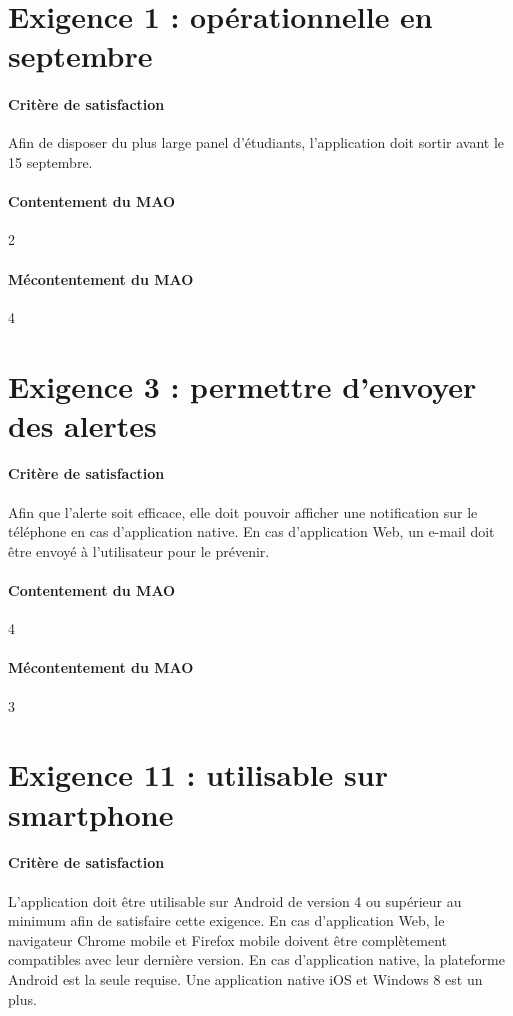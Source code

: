 \documentclass[a4paper, 12pt, french]{article}
\begin{document}
	\section{Exigence 1 : opérationnelle en septembre}

	\paragraph{Critère de satisfaction}
	Afin de disposer du plus large panel d'étudiants, l'application doit sortir avant le 15 septembre.

	\paragraph{Contentement du MAO}
	2

	\paragraph{Mécontentement du MAO}
	4

	\section{Exigence 3 : permettre d'envoyer des alertes}

	\paragraph{Critère de satisfaction}
	Afin que l'alerte soit efficace, elle doit pouvoir afficher une notification sur le téléphone en cas d'application native. En cas d'application Web, un e-mail doit être envoyé à l'utilisateur pour le prévenir.

	\paragraph{Contentement du MAO}
	4

	\paragraph{Mécontentement du MAO}
	3

	\section{Exigence 11 : utilisable sur smartphone}

	\paragraph{Critère de satisfaction}
	L'application doit être utilisable sur Android de version 4 ou supérieur au minimum afin de satisfaire cette exigence. En cas d'application Web, le navigateur Chrome mobile et Firefox mobile doivent être complètement compatibles avec leur dernière version. En cas d'application native, la plateforme Android est la seule requise. Une application native iOS et Windows 8 est un plus.
\end{document}
